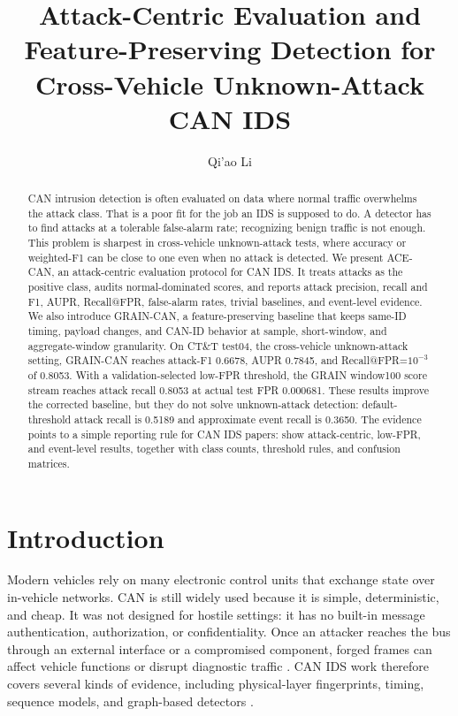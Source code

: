 \documentclass[runningheads]{llncs}
\newcommand{\method}{GRAIN-CAN}
\newcommand{\framework}{ACE-CAN}
\begin{document}
%
\title{Attack-Centric Evaluation and Feature-Preserving Detection for Cross-Vehicle Unknown-Attack CAN IDS}
%
\author{Qi'ao Li}
%
\maketitle
%
\begin{abstract}
CAN intrusion detection is often evaluated on data where normal traffic overwhelms the attack class.  That is a poor fit for the job an IDS is supposed to do.  A detector has to find attacks at a tolerable false-alarm rate; recognizing benign traffic is not enough.  This problem is sharpest in cross-vehicle unknown-attack tests, where accuracy or weighted-F1 can be close to one even when no attack is detected.  We present \framework, an attack-centric evaluation protocol for CAN IDS.  It treats attacks as the positive class, audits normal-dominated scores, and reports attack precision, recall and F1, AUPR, Recall@FPR, false-alarm rates, trivial baselines, and event-level evidence.  We also introduce \method, a feature-preserving baseline that keeps same-ID timing, payload changes, and CAN-ID behavior at sample, short-window, and aggregate-window granularity.  On CT\&T test04, the cross-vehicle unknown-attack setting, \method{} reaches attack-F1 0.6678, AUPR 0.7845, and Recall@FPR=$10^{-3}$ of 0.8053.  With a validation-selected low-FPR threshold, the GRAIN window100 score stream reaches attack recall 0.8053 at actual test FPR 0.000681.  These results improve the corrected baseline, but they do not solve unknown-attack detection: default-threshold attack recall is 0.5189 and approximate event recall is 0.3650.  The evidence points to a simple reporting rule for CAN IDS papers: show attack-centric, low-FPR, and event-level results, together with class counts, threshold rules, and confusion matrices.
\end{abstract}
%
\section{Introduction}
Modern vehicles rely on many electronic control units that exchange state over in-vehicle networks.  CAN is still widely used because it is simple, deterministic, and cheap.  It was not designed for hostile settings: it has no built-in message authentication, authorization, or confidentiality.  Once an attacker reaches the bus through an external interface or a compromised component, forged frames can affect vehicle functions or disrupt diagnostic traffic \cite{koscher2010experimental,checkoway2011comprehensive,miller2015remote}.  CAN IDS work therefore covers several kinds of evidence, including physical-layer fingerprints, timing, sequence models, and graph-based detectors \cite{cho2016fingerprinting,cho2017viden,lampe2023review,dupont2019network}.
\end{document}
